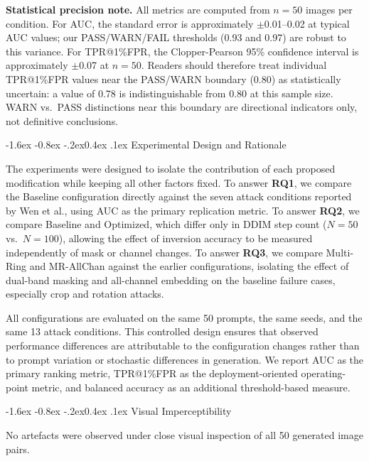 \documentclass[10pt,twocolumn]{article}
\makeatletter
\renewcommand\subsection{\@startsection{subsection}{2}{\z@}%
  {-1.6ex \@plus -0.8ex \@minus -.2ex}{0.4ex \@plus .1ex}%
  {\normalfont\normalsize\itshape}}
\makeatother
\begin{document}
\noindent\textbf{Statistical precision note.}
All metrics are computed from $n{=}50$ images per condition.
For AUC, the standard error is approximately $\pm$0.01--0.02 at typical
AUC values; our PASS/WARN/FAIL thresholds (0.93 and 0.97) are robust to
this variance.
For TPR@1\%FPR, the Clopper-Pearson 95\% confidence interval is
approximately $\pm$0.07 at $n{=}50$.
Readers should therefore treat individual TPR@1\%FPR values near the
PASS/WARN boundary (0.80) as statistically uncertain: a value of 0.78
is indistinguishable from 0.80 at this sample size.
WARN vs.\ PASS distinctions near this boundary are directional indicators
only, not definitive conclusions.

\subsection{Experimental Design and Rationale}

The experiments were designed to isolate the contribution of each
proposed modification while keeping all other factors fixed.
To answer \textbf{RQ1}, we compare the Baseline configuration directly
against the seven attack conditions reported by Wen et al., using AUC as
the primary replication metric.
To answer \textbf{RQ2}, we compare Baseline and Optimized, which differ
only in DDIM step count ($N{=}50$ vs.\ $N{=}100$), allowing the effect
of inversion accuracy to be measured independently of mask or channel
changes.
To answer \textbf{RQ3}, we compare Multi-Ring and MR-AllChan against the
earlier configurations, isolating the effect of dual-band masking and
all-channel embedding on the baseline failure cases, especially crop and
rotation attacks.

All configurations are evaluated on the same 50 prompts, the same seeds,
and the same 13 attack conditions.
This controlled design ensures that observed performance differences are
attributable to the configuration changes rather than to prompt
variation or stochastic differences in generation.
We report AUC as the primary ranking metric, TPR@1\%FPR as the
deployment-oriented operating-point metric, and balanced accuracy as an
additional threshold-based measure.


\subsection{Visual Imperceptibility}

No artefacts were observed under close visual inspection
of all 50 generated image pairs.
\end{document}
